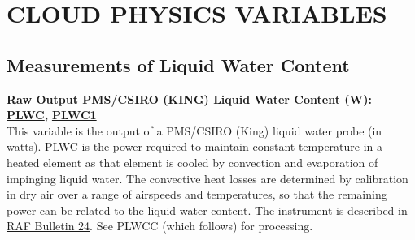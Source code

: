 
\section{CLOUD PHYSICS VARIABLES}


\subsection{Measurements of Liquid Water Content}
\begin{hangparagraphs}
\textbf{Raw Output PMS/CSIRO (KING) Liquid Water Content (W): }\textbf{\uline{PLWC}}\textbf{,
}\textbf{\uline{PLWC1}}\\
This variable is the output of a PMS/CSIRO (King)
liquid water probe (in watts). PLWC is the power required to maintain
constant temperature in a heated element as that element is cooled
by convection and evaporation of impinging liquid water. The convective
heat losses are determined by calibration in dry air over a range
of airspeeds and temperatures, so that the remaining power can be
related to the liquid water content. The instrument is described in
\href{http://www.eol.ucar.edu/raf/Bulletins/bulletin24.html}{RAF Bulletin 24}.
See PLWCC (which follows) for processing.\\



\end{hangparagraphs}
